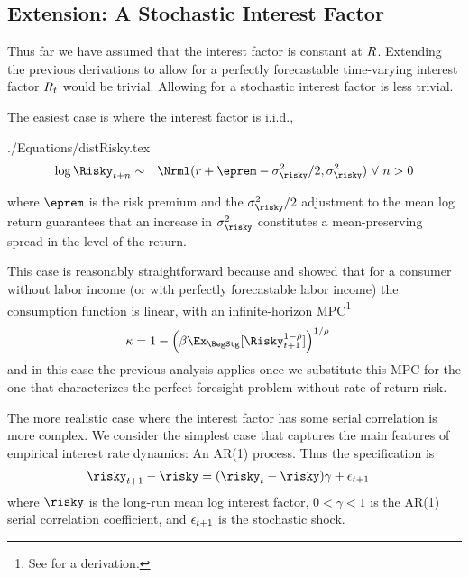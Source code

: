 \documentclass[SolvingMicroDSOPs]{subfiles}
\begin{document}
\subsection{Extension: A Stochastic Interest Factor}


Thus far we have assumed that the interest factor is constant at $R$.  Extending the
previous derivations to allow for a perfectly forecastable time-varying interest factor $R_{t}$
would be trivial.  Allowing for a stochastic interest factor is less trivial.


The easiest case is where the interest factor is i.i.d.,
\begin{verbatimwrite}{./Equations/distRisky.tex}
  \begin{equation}\begin{gathered}\begin{aligned}
        \log \Risky_{t+n} & \sim & \Nrml(\rfree + \eprem - \sigma^{2}_{\risky}/2,\sigma^{2}_{\risky}) ~\forall~n>0 \label{eq:distRisky}
      \end{aligned}\end{gathered}\end{equation}
\end{verbatimwrite}
\unskip
where $\eprem$ is the risk premium and the $\sigma^{2}_{\risky}/2$ adjustment to the mean log return
guarantees that an increase in $\sigma^{2}_{\risky}$ constitutes a mean-preserving spread in the level of the return.

This case is reasonably straightforward because \cite{merton:restat} and \cite{samuelson:portfolio} showed
that for a consumer without labor income (or with perfectly forecastable labor income) the consumption
function is linear, with an infinite-horizon MPC\footnote{See  for a derivation.}
\begin{equation}\begin{gathered}\begin{aligned}
      \MPC  & = 1- \left(\DiscFac  \Ex_{\BegStg}[\Risky_{\prd+1}^{1-\CRRA}]\right)^{1/\CRRA} \label{eq:MPCExact}
    \end{aligned}\end{gathered}\end{equation}
and in this case the previous analysis applies once we substitute this MPC for the one that characterizes
the perfect foresight problem without rate-of-return risk.

The more realistic case where the interest factor has some serial correlation is more complex.  We consider
the simplest case that captures the main features of empirical interest rate dynamics: An AR(1) process.  Thus
the specification is
\begin{equation}\begin{gathered}\begin{aligned}
      \risky_{\prd+1}-\risky  & = (\risky_{\prd}-\risky) \gamma + \epsilon_{\prd+1}
    \end{aligned}\end{gathered}\end{equation}
where $\risky$ is the long-run mean log interest factor, $0 < \gamma < 1$ is the AR(1) serial correlation
coefficient, and $\epsilon_{t+1}$ is the stochastic shock.
\end{document}
